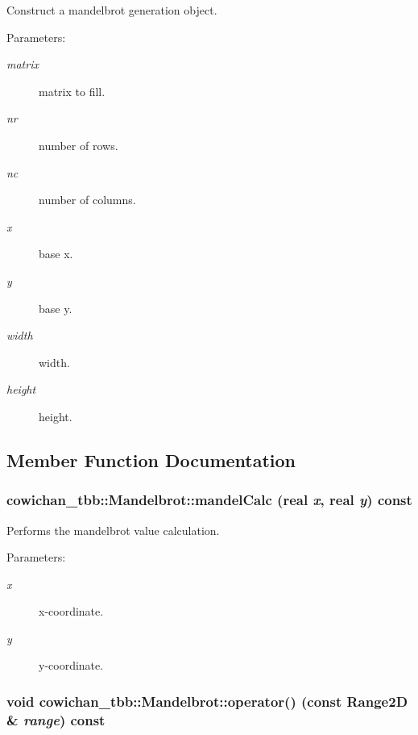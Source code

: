 Construct a mandelbrot generation object. \begin{Desc}
\item[Parameters:]
\begin{description}
\item[{\em matrix}]matrix to fill. \item[{\em nr}]number of rows. \item[{\em nc}]number of columns. \item[{\em x}]base x. \item[{\em y}]base y. \item[{\em width}]width. \item[{\em height}]height. \end{description}
\end{Desc}


\subsection{Member Function Documentation}
\hypertarget{classcowichan__tbb_1_1_mandelbrot_12f71733227567ee4519921eb42e505b}{
\subsubsection[{mandelCalc}]{ cowichan\_\-tbb::Mandelbrot::mandelCalc ({\bf real} {\em x}, \/  {\bf real} {\em y}) const}}
\label{classcowichan__tbb_1_1_mandelbrot_12f71733227567ee4519921eb42e505b}


Performs the mandelbrot value calculation. \begin{Desc}
\item[Parameters:]
\begin{description}
\item[{\em x}]x-coordinate. \item[{\em y}]y-coordinate. \end{description}
\end{Desc}
\hypertarget{classcowichan__tbb_1_1_mandelbrot_5c8093ee0a5690df3260109e03174f97}{
\subsubsection[{operator()}]{\setlength{\rightskip}{0pt plus 5cm}void cowichan\_\-tbb::Mandelbrot::operator() (const {\bf Range2D} \& {\em range}) const}}
\label{classcowichan__tbb_1_1_mandelbrot_5c8093ee0a5690df3260109e03174f97}


